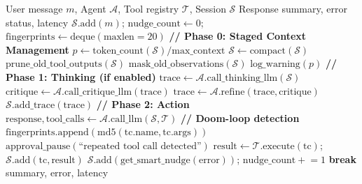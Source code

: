 \begin{algorithm}[t]
\caption{Extended ReAct Loop with Five-Stage Compaction and Doom-Loop Detection}
\label{alg:react}
\begin{algorithmic}[1]
\Require User message $m$, Agent $\mathcal{A}$, Tool registry $\mathcal{T}$, Session $\mathcal{S}$
\Ensure Response summary, error status, latency
\State $\mathcal{S}.\text{add}(m)$; $\text{nudge\_count} \gets 0$; $\text{fingerprints} \gets \text{deque}(\text{maxlen}=20)$
\Repeat
    \State \textbf{// Phase 0: Staged Context Management}
    \State $p \gets \text{token\_count}(\mathcal{S}) / \text{max\_context}$ 
     $\mathcal{S} \gets \text{compact}(\mathcal{S})$ 
     $\text{prune\_old\_tool\_outputs}(\mathcal{S})$ 
     $\text{mask\_old\_observations}(\mathcal{S})$ 
     $\text{log\_warning}(p)$
    \EndIf
    \State \textbf{// Phase 1: Thinking (if enabled)}
        \State $\text{trace} \gets \mathcal{A}.\text{call\_thinking\_llm}(\mathcal{S})$ 
         
            \State $\text{critique} \gets \mathcal{A}.\text{call\_critique\_llm}(\text{trace})$
            \State $\text{trace} \gets \mathcal{A}.\text{refine}(\text{trace}, \text{critique})$
        \EndIf
        \State $\mathcal{S}.\text{add\_trace}(\text{trace})$
    \EndIf
    \State \textbf{// Phase 2: Action}
    \State $\text{response}, \text{tool\_calls} \gets \mathcal{A}.\text{call\_llm}(\mathcal{S}, \mathcal{T})$ 
        \State \textbf{// Doom-loop detection}
            \State $\text{fingerprints}.\text{append}(\text{md5}(\text{tc.name}, \text{tc.args}))$
        \EndFor
            \State $\text{approval\_pause}(\text{``repeated tool call detected''})$
        \Else
                \State $\text{result} \gets \mathcal{T}.\text{execute}(\text{tc})$; $\mathcal{S}.\text{add}(\text{tc}, \text{result})$
            \EndFor
        \EndIf
    \Else
            \State $\mathcal{S}.\text{add}(\text{get\_smart\_nudge}(\text{error}))$; $\text{nudge\_count} \mathrel{+}= 1$
        \Else{} \textbf{break} 
        \EndIf
    \EndIf
{}
\State \Return summary, error, latency
\end{algorithmic}
\end{algorithm}

